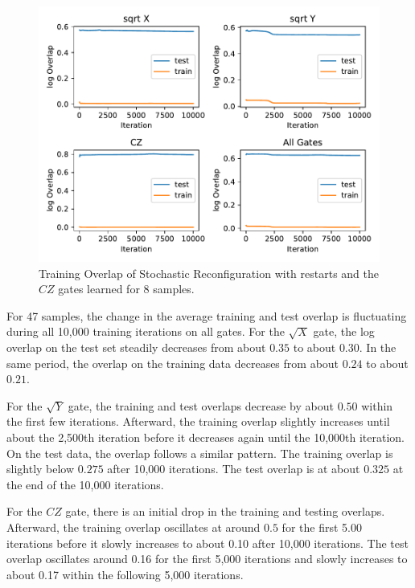 \begin{figure}[H]
  \centering
  \includegraphics[width=\textwidth]{figures/results/SR-restarts-learned/avgOverlap_8.pdf}
  \caption[Training overlap of Stochastic Reconfiguration with restarts learned]{Training 
  Overlap of Stochastic Reconfiguration with restarts and the $CZ$ gates learned for 8 samples.}
  \label{fig:sr_restarts_overlap_8}
\end{figure}

For 47 samples, the change in the average training and test overlap is fluctuating during all 10,000
training iterations on all gates. For the 
$\sqrt{X}$ gate, the log overlap on the test set steadily decreases from 
about $0.35$ to about $0.30$. In the same period, the overlap on the training data decreases from about $0.24$ to about $0.21$.

For the $\sqrt{Y}$ gate, the training and test overlaps decrease by about $0.50$ within the first few iterations. 
Afterward, the training overlap slightly increases until about the 2,500th iteration before it decreases again 
until the 10,000th iteration. On the test data, the overlap follows a similar pattern. The 
training overlap is slightly below $0.275$ after 10,000 iterations. The test overlap is at about $0.325$ 
at the end of the 10,000 iterations. 

For the $CZ$ gate, there is an initial drop in the training and testing overlaps. Afterward, 
the training overlap oscillates at around $0.5$ for the first 5.00 iterations before it slowly increases to about 
0.10 after 10,000 iterations. The test overlap oscillates around 0.16 for the first 5,000 iterations and 
slowly increases to about 0.17 within the following 5,000 iterations. 

